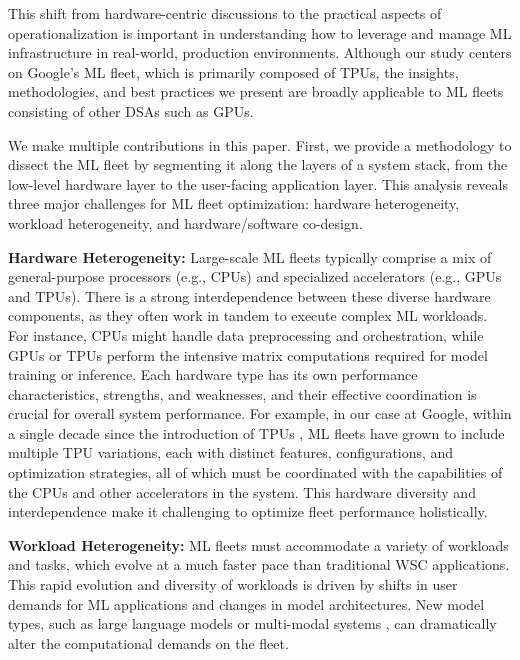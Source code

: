 This shift from hardware-centric discussions to the practical aspects of operationalization is important in understanding how to leverage and manage ML infrastructure in real-world, production environments. Although our study centers on Google's ML fleet, which is primarily composed of TPUs, the insights, methodologies, and best practices we present are broadly applicable to ML fleets consisting of other DSAs such as GPUs.

We make multiple contributions in this paper.  First, we provide a methodology to dissect the ML fleet by segmenting it along the layers of a system stack, from the low-level hardware layer to the user-facing application layer. This analysis reveals three major challenges for ML fleet optimization: hardware heterogeneity, workload heterogeneity, and hardware/software co-design.











\textbf{Hardware Heterogeneity:} Large-scale ML fleets typically comprise a mix of general-purpose processors (e.g., CPUs) and specialized accelerators (e.g., GPUs and TPUs). There is a strong interdependence between these diverse hardware components, as they often work in tandem to execute complex ML workloads. For instance, CPUs might handle data preprocessing and orchestration, while GPUs or TPUs perform the intensive matrix computations required for model training or inference. Each hardware type has its own performance characteristics, strengths, and weaknesses, and their effective coordination is crucial for overall system performance.  For example, in our case at Google, within a single decade since the introduction of TPUs \cite{jouppi2017indatacenter}, ML fleets have grown to include multiple TPU variations, each with distinct features, configurations, and optimization strategies, all of which must be coordinated with the capabilities of the CPUs and other accelerators in the system. This hardware diversity and interdependence make it challenging to optimize fleet performance holistically.






\textbf{Workload Heterogeneity:} ML fleets must accommodate a variety of workloads and tasks, which evolve at a much faster pace than traditional WSC applications. This rapid evolution and diversity of workloads is driven by shifts in user demands for ML applications and changes in model architectures. New model types, such as large language models \cite{vaswani2017attention} or multi-modal systems \citep{driess2023palme,yu2022coca}, can dramatically alter the computational demands on the fleet. 

